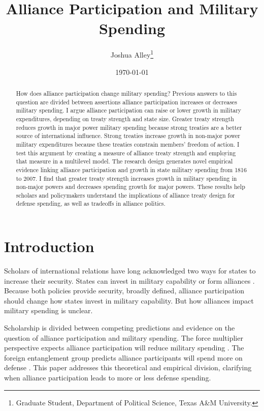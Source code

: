 \documentclass[12pt]{article}
\title{\textbf{Alliance Participation and Military Spending}}
\author{Joshua Alley\footnote{Graduate Student,
Department of Political Science, Texas A\&M University.}}
\date{{\normalsize \today}}
\begin{document}
\maketitle 

\newpage 

\doublespace 

\begin{abstract}
How does alliance participation change military spending? 
Previous answers to this question are divided between assertions alliance participation increases or decreases military spending. 
I argue alliance participation can raise or lower growth in military expenditures, depending on treaty strength and state size. 
Greater treaty strength reduces growth in major power military spending because strong treaties are a better source of international influence. 
Strong treaties increase growth in non-major power military expenditures because these treaties constrain members' freedom of action. 
I test this argument by creating a measure of alliance treaty strength and employing that measure in a multilevel model. 
The research design generates novel empirical evidence linking alliance participation and growth in state military spending from 1816 to 2007. 
I find that greater treaty strength increases growth in military spending in non-major powers and decreases spending growth for major powers.  
These results help scholars and policymakers understand the implications of alliance treaty design for defense spending, as well as tradeoffs in alliance politics. 
\end{abstract}



\section{Introduction}


Scholars of international relations have long acknowledged two ways for states to increase their security. 
States can invest in military capability or form alliances \citep{Morgenthau1948}.
Because both policies provide security, broadly defined, alliance participation should change how states invest in military capability. 
But how alliances impact military spending is unclear. 


Scholarship is divided between competing predictions and evidence on the question of alliance participation and military spending. 
The force multiplier perspective expects alliance participation will reduce military spending \citep{Morrow1993, Conybeare1994, DigiuseppePoast2016}. 
The foreign entanglement group predicts alliance participants will spend more on defense \citep{Diehl1994, MorganPalmer2006}. 
This paper addresses this theoretical and empirical division, clarifying when alliance participation leads to more or less defense spending. 
\end{document}
